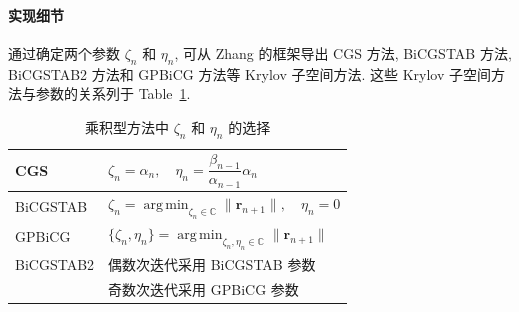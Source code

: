 \paragraph{{实现细节}}\label{subsec:product-implementation}\mbox{}\par
{通过确定两个参数 $\zeta_n$ 和 $\eta_n$, 可从 Zhang 的框架导出 CGS 方法, BiCGSTAB 方法, BiCGSTAB2 方法和 GPBiCG 方法等 Krylov 子空间方法. 这些 Krylov 子空间方法与参数的关系列于 Table\ \ref{tab:product-parameters}.}
\begin{table}[H]\centering
\caption{{乘积型方法中 $\zeta_n$ 和 $\eta_n$ 的选择}}\label{tab:product-parameters}
\begin{tabular}{l|l}\hline
CGS&$\zeta_n=\alpha_n,\quad\eta_n=\dfrac{\beta_{n-1}}{\alpha_{n-1}}\alpha_n$\\\hline
BiCGSTAB&$\zeta_n=\operatorname*{arg\,min}_{\zeta_n\in\mathbb C}\|\bm r_{n+1}\|,\quad\eta_n=0$\\\hline
GPBiCG&$\{\zeta_n,\eta_n\}=\operatorname*{arg\,min}_{\zeta_n,\eta_n\in\mathbb C}\|\bm r_{n+1}\|$\\\hline
BiCGSTAB2&{偶数次迭代采用 BiCGSTAB 参数}\\
&{奇数次迭代采用 GPBiCG 参数}\\\hline
\end{tabular}\end{table}
